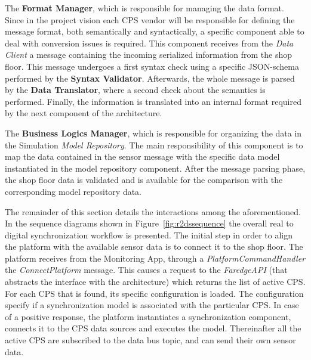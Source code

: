 \begin{description}
\item The \textbf{Format Manager}, which is responsible for managing the data format. Since in the project vision each CPS vendor will be responsible for defining the message format, both semantically and syntactically, a specific component able to deal with conversion issues is required.
This component receives from the \textit{Data Client} a message containing the incoming serialized information from the shop floor. 
This message undergoes a first syntax check using a specific JSON-schema performed by the \textbf{Syntax Validator}. 
Afterwards, the whole message is parsed by the \textbf{Data Translator}, where a second check about the semantics is performed. 
Finally, the information is translated into an internal format required by the next component of the architecture. 

\item The \textbf{Business Logics Manager}, which is responsible for organizing the data in the Simulation \textit{Model Repository}. The main responsibility of this component is to map the data contained in the sensor message with the specific data model instantiated in the model repository component.
After the message parsing phase, the shop floor data is validated and is available for the comparison with the corresponding model repository data.
\end{description}



The remainder of this section details the interactions among the aforementioned. In the sequence diagrams shown in Figure~\ref{fig:r2dssequence} the overall real to digital synchronization workflow is presented.
The initial step in order to align the platform with the available sensor data is to connect it to the shop floor. 
The platform receives from the Monitoring App, through a \textit{PlatformCommandHandler} the \textit{ConnectPlatform} message. 
This causes a request to the \textit{FaredgeAPI} (that abstracts the interface with the architecture) which returns the list of active CPS.
For each CPS that is found, its specific configuration is loaded. The configuration specify if a synchronization model is associated with the particular CPS.  In case of a positive response, the platform instantiates a synchronization component, connects it to the CPS data sources and executes the model. Thereinafter all the active CPS are subscribed to the data bus topic, and can send their own sensor data.


